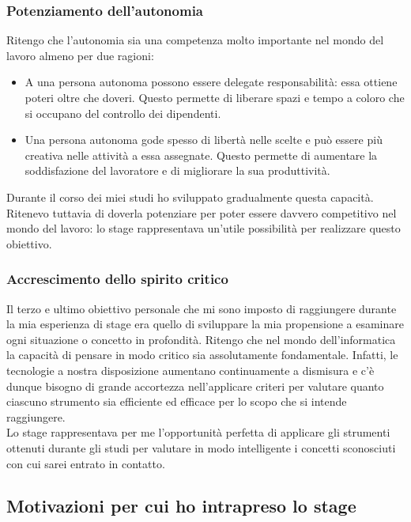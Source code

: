 			\subsubsection{Potenziamento dell'autonomia}
				Ritengo che l'autonomia sia una competenza molto importante nel mondo del lavoro almeno per due ragioni:
				\begin{itemize}
					\item A una persona autonoma possono essere delegate responsabilità: essa ottiene poteri oltre che doveri.
					Questo permette di liberare spazi e tempo a coloro che si occupano del controllo dei dipendenti.
					\item Una persona autonoma gode spesso di libertà nelle scelte e può essere più creativa nelle attività a
					essa assegnate. Questo permette di aumentare la soddisfazione del lavoratore e di migliorare la sua
					produttività. 
				\end{itemize}
				Durante il corso dei miei studi ho sviluppato gradualmente questa capacità. Ritenevo tuttavia di doverla potenziare
				per poter essere davvero competitivo nel mondo del lavoro: lo stage rappresentava un'utile possibilità per realizzare
				questo obiettivo.
			\subsubsection{Accrescimento dello spirito critico}
				Il terzo e ultimo obiettivo personale che mi sono imposto di raggiungere durante la mia esperienza di stage era
				quello di sviluppare la mia propensione a esaminare ogni situazione o concetto in profondità. Ritengo che nel mondo
				dell'informatica la capacità di pensare in modo critico sia assolutamente fondamentale. Infatti, le tecnologie a
				nostra disposizione aumentano continuamente a dismisura e c'è dunque bisogno di grande accortezza nell'applicare
				criteri per valutare quanto ciascuno strumento sia efficiente ed efficace per lo scopo che si intende raggiungere.\\
				Lo stage rappresentava per me l'opportunità perfetta di applicare gli strumenti ottenuti durante gli studi per
				valutare in modo intelligente i concetti sconosciuti con cui sarei entrato in contatto.
		\subsection{Motivazioni per cui ho intrapreso lo stage}
